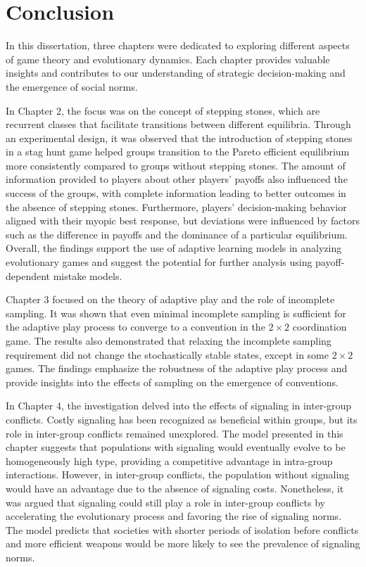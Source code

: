 \chapter{Conclusion}

In this dissertation, three chapters were dedicated to exploring different aspects of game theory and evolutionary dynamics. Each chapter provides valuable insights and contributes to our understanding of strategic decision-making and the emergence of social norms. 

In Chapter 2, the focus was on the concept of stepping stones, which are recurrent classes that facilitate transitions between different equilibria. Through an experimental design, it was observed that the introduction of stepping stones in a stag hunt game helped groups transition to the Pareto efficient equilibrium more consistently compared to groups without stepping stones. The amount of information provided to players about other players' payoffs also influenced the success of the groups, with complete information leading to better outcomes in the absence of stepping stones. Furthermore, players' decision-making behavior aligned with their myopic best response, but deviations were influenced by factors such as the difference in payoffs and the dominance of a particular equilibrium. Overall, the findings support the use of adaptive learning models in analyzing evolutionary games and suggest the potential for further analysis using payoff-dependent mistake models.

Chapter 3 focused on the theory of adaptive play and the role of incomplete sampling. It was shown that even minimal incomplete sampling is sufficient for the adaptive play process to converge to a convention in the $2\times 2$ coordination game. The results also demonstrated that relaxing the incomplete sampling requirement did not change the stochastically stable states, except in some $2 \times 2$ games. The findings emphasize the robustness of the adaptive play process and provide insights into the effects of sampling on the emergence of conventions.

In Chapter 4, the investigation delved into the effects of signaling in inter-group conflicts. Costly signaling has been recognized as beneficial within groups, but its role in inter-group conflicts remained unexplored. The model presented in this chapter suggests that populations with signaling would eventually evolve to be homogeneously high type, providing a competitive advantage in intra-group interactions. However, in inter-group conflicts, the population without signaling would have an advantage due to the absence of signaling costs. Nonetheless, it was argued that signaling could still play a role in inter-group conflicts by accelerating the evolutionary process and favoring the rise of signaling norms. The model predicts that societies with shorter periods of isolation before conflicts and more efficient weapons would be more likely to see the prevalence of signaling norms.

